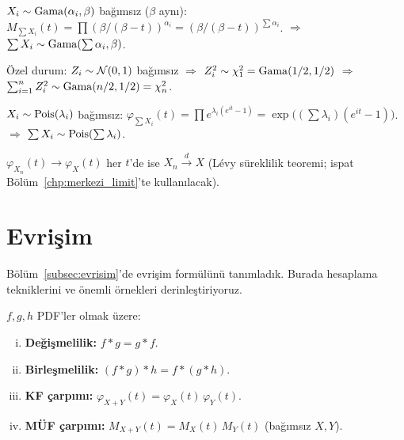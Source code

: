 \begin{ornek}
$X_i \sim \operatorname{Gama}(\alpha_i, \beta)$ bağımsız ($\beta$ aynı):
$M_{\sum X_i}(t) = \prod (\beta/(\beta-t))^{\alpha_i} = (\beta/(\beta-t))^{\sum\alpha_i}$.
$\Rightarrow$ $\sum X_i \sim \operatorname{Gama}(\sum\alpha_i, \beta)$.

Özel durum: $Z_i \sim \mathcal{N}(0,1)$ bağımsız $\Rightarrow$ $Z_i^2 \sim \chi^2_1 = \operatorname{Gama}(1/2,1/2)$
$\Rightarrow$ $\sum_{i=1}^n Z_i^2 \sim \operatorname{Gama}(n/2,1/2) = \chi^2_n$.
\end{ornek}

\begin{ornek}
$X_i \sim \operatorname{Pois}(\lambda_i)$ bağımsız:
$\varphi_{\sum X_i}(t) = \prod e^{\lambda_i(e^{it}-1)} = \exp\!\bigl((\sum\lambda_i)(e^{it}-1)\bigr)$.
$\Rightarrow$ $\sum X_i \sim \operatorname{Pois}(\sum\lambda_i)$.
\end{ornek}

\begin{teorem}
\label{thm:kf_yaklinsama}
$\varphi_{X_n}(t) \to \varphi_X(t)$ her $t$'de ise $X_n \xrightarrow{d} X$
(Lévy süreklilik teoremi; ispat Bölüm~\ref{chp:merkezi_limit}'te kullanılacak).
\end{teorem}

\section{Evrişim}
\label{sec:evrisim}

Bölüm~\ref{subsec:evrisim}'de evrişim formülünü tanımladık. Burada hesaplama
tekniklerini ve önemli örnekleri derinleştiriyoruz.

\begin{teorem}
\label{thm:evrisim_ozellik}
$f, g, h$ PDF'ler olmak üzere:
\begin{enumerate}[(i)]
  \item \textbf{Değişmelilik:} $f * g = g * f$.
  \item \textbf{Birleşmelilik:} $(f * g) * h = f * (g * h)$.
  \item \textbf{KF çarpımı:} $\varphi_{X+Y}(t) = \varphi_X(t)\,\varphi_Y(t)$.
  \item \textbf{MÜF çarpımı:} $M_{X+Y}(t) = M_X(t)\,M_Y(t)$ (bağımsız $X,Y$).
\end{enumerate}
\end{teorem}

